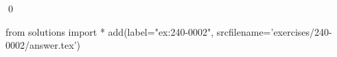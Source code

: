 
\begin{ex} 
  \label{ex:240-0002}
  
  \qed
\end{ex} 
\begin{python0}
from solutions import *
add(label="ex:240-0002",
    srcfilename='exercises/240-0002/answer.tex') 
\end{python0}
